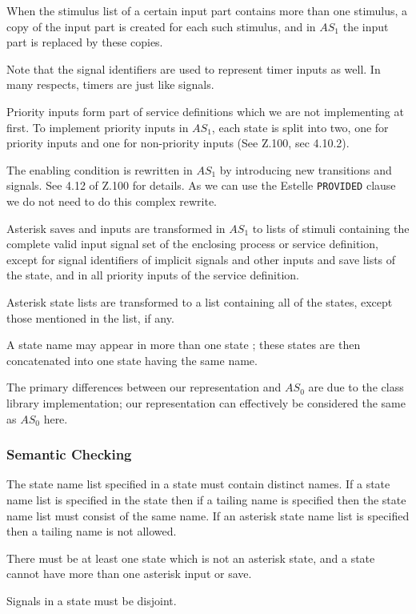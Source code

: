 When the stimulus list of a certain input part contains more than one
stimulus, a copy of the input part is created for each such stimulus,
and in $AS_1$ the input part is replaced by these copies.

Note that the signal identifiers are used to represent timer
inputs as well. In many respects, timers are just like signals.

Priority inputs form part of service definitions which we
are not implementing at first. To implement priority inputs
in $AS_1$, each state is split into two, one for priority inputs and
one for non-priority inputs (See Z.100, sec 4.10.2).

The enabling condition is rewritten in $AS_1$ by introducing new
transitions and signals. See 4.12 of Z.100 for details. As we can use the
Estelle {\tt PROVIDED} clause we do not need to do this complex
rewrite.

Asterisk saves and inputs are transformed in $AS_1$ to lists of stimuli
containing the complete valid input signal set of the enclosing
process or service definition, except for signal identifiers of
implicit signals and other inputs and save lists of the state,
and in all priority inputs of the service definition.

Asterisk state lists are transformed to a list containing all of the
states, except those mentioned in the list, if any.

A state name may appear in more than one state ; these states are
then concatenated into one state having the same name.

The primary differences between our representation and $AS_0$ are due
to the class library implementation; our representation can
effectively be considered the same as $AS_0$ here.

\subsubsection{Semantic Checking}

The state name list specified in a state must contain distinct
names. If a state name list is specified in the state then if a
tailing name is specified then the state name list must consist of
the same name. If an asterisk state name list is specified then a 
tailing name is not allowed.

There must be at least one state which is not an asterisk
state, and a state cannot have more than one asterisk input or save.

Signals in a state must be disjoint.

